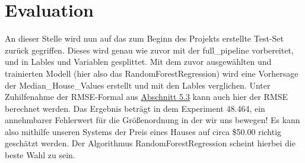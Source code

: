 \section{Evaluation}
\label{evaluation}
An dieser Stelle wird nun auf das zum Beginn des Projekts erstellte Test-Set zurück gegriffen. Dieses wird genau wie zuvor mit der full\_pipeline vorbereitet, und in Lables und Variablen gesplittet. Mit dem zuvor ausgewählten und trainierten Modell (hier also das RandomForestRegression) wird eine Vorhersage der Median\_House\_Values erstellt und mit den Lables verglichen. Unter Zuhilfenahme der \ac{RMSE}-Formal aus \hyperlink{datensatz}{Abschnitt 5.3} kann auch hier der \ac{RMSE} berechnet werden. Das Ergebnis beträgt in dem Experiment 48.464, ein annehmbarer Fehlerwert für die Größenordnung in der wir uns bewegen! Es kann also mithilfe unseren Systems der Preis eines Hauses auf circa \$50.00 richtig geschätzt werden. 
Der Algorithmus RandomForestRegression scheint hierbei die beste Wahl zu sein.


